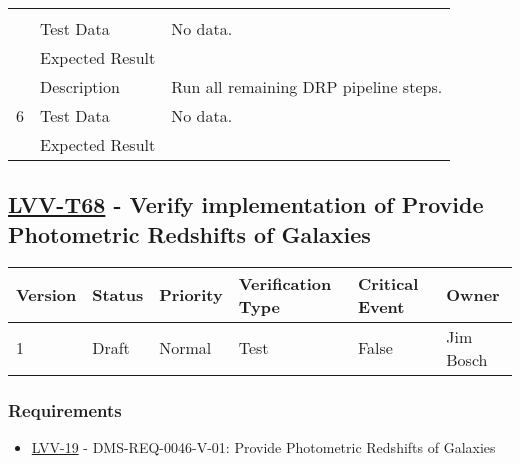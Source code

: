 \begin{longtable}[]{p{1.3cm}p{2cm}p{13cm}}
\begin{minipage}[t]{13cm}
{            \vspace{\dp0}
            } \end{minipage} \\ \cline{2-3}
            & Test Data &
            \begin{minipage}[t]{13cm}{\footnotesize
                No data.
                \vspace{\dp0}
            } \end{minipage} \\ \cline{2-3}
            & Expected Result &
        \\ \midrule

            \multirow{3}{*}{ 6 } & Description &
            \begin{minipage}[t]{13cm}{\footnotesize
            Run all remaining DRP pipeline steps.

            \vspace{\dp0}
            } \end{minipage} \\ \cline{2-3}
            & Test Data &
            \begin{minipage}[t]{13cm}{\footnotesize
                No data.
                \vspace{\dp0}
            } \end{minipage} \\ \cline{2-3}
            & Expected Result &
        \\ \midrule
    \end{longtable}

\subsection{\href{https://jira.lsstcorp.org/secure/Tests.jspa\#/testCase/LVV-T68}{LVV-T68}
    - Verify implementation of Provide Photometric Redshifts of Galaxies}\label{lvv-t68}

\begin{longtable}[]{llllll}
\toprule
Version & Status & Priority & Verification Type & Critical Event & Owner
\\\midrule
1 & Draft & Normal &
Test & False & Jim Bosch
\\\bottomrule
\end{longtable}

\subsubsection{Requirements}
\begin{itemize}
\item \href{https://jira.lsstcorp.org/browse/LVV-19}{LVV-19} - DMS-REQ-0046-V-01: Provide Photometric Redshifts of Galaxies
\end{itemize}

